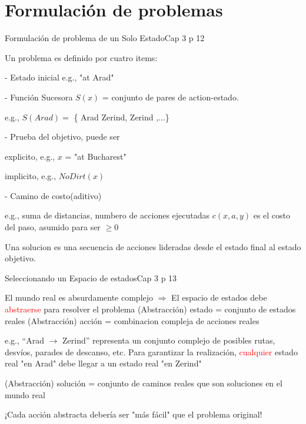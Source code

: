 \documentclass{beamer}
\theoremstyle{definition}
\theoremstyle{theorem}
\theoremstyle{remark}
\begin{document}
\section{Formulación de problemas}%


\begin{frame}{Formulación de problema de un Solo Estado}{Cap 3 p 12}
\begin{right}

Un problema es definido por cuatro items:

- Estado inicial e.g., "at Arad"

- Función Sucesora $S(x)$ = conjunto de pares de action-estado.

    e.g., $S(Arad)=$ \{  \left\langle Arad  \longrightarrow Zerind, Zerind \right\rangle,...\}
    
- Prueba del objetivo, puede ser

explicito, e.g., $x$ = "at Bucharest"

implicito, e.g., $NoDirt(x)$

- Camino de costo(aditivo)

e.g., suma de distancias, numbero de acciones ejecutadas $c(x,a,y)$ es el costo del paso, asumido para ser $ \geq 0$

Una solucion es una secuencia de acciones lideradas desde el estado final al estado objetivo.

\end{right}
\end{frame}

\begin{frame}{Seleccionando un Espacio de estados}{Cap 3 p 13}
    
    El mundo real es absurdamente complejo \newline
    \hspace*{1em} $\Rightarrow$ El espacio de estados debe \textcolor{red}{abstraerse} para resolver el problema \newline
    (Abstracción) estado = conjunto de estados reales\newline
    (Abstracción) acción = combinacion compleja de acciones reales\newline
   
    \hspace*{1em} e.g., “Arad $\rightarrow$ Zerind” representa un conjunto complejo de posibles rutas, desvíos, parades de descanso, etc. \newline
    Para garantizar la realización, \textcolor{red}{cualquier} estado real "en Arad" debe llegar a un estado real "en Zerind"\newline
    
    (Abstracción) solución = \newline
    \hspace*{1em} conjunto de caminos reales que son soluciones en el mundo real
    
    ¡Cada acción abstracta debería ser "más fácil" que el problema original!    
    
\end{frame}
\end{document}
